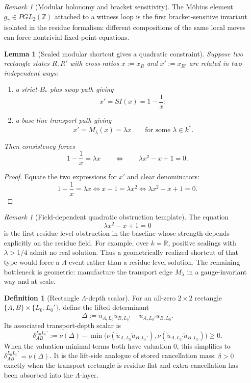 \documentclass[11pt]{amsart}
\numberwithin{equation}{section}
\theoremstyle{plain}
\newtheorem{lemma}[theorem]{Lemma}
\theoremstyle{definition}
\newtheorem{definition}[theorem]{Definition}
\theoremstyle{remark}
\newtheorem{remark}[theorem]{Remark}
\newcommand{\Lam}{\Lambda}
\begin{document}
\begin{remark}[Modular holonomy and bracket sensitivity]
\label{rem:modular-holonomy-associator}
The M\"obius element $g_\gamma\in PGL_2(\mathbb Z)$ attached to a witness loop is the first bracket-sensitive invariant isolated in the residue formalism: different compositions of the same local moves can force nontrivial fixed-point equations.
\end{remark}

\begin{lemma}[Scaled modular shortcut gives a quadratic constraint]
\label{lem:scaled-modular-shortcut-quadratic}
Suppose two rectangle states $R,R'$ with cross-ratios $x:=x_R$ and $x':=x_{R'}$ are related in two independent ways:
\begin{enumerate}[leftmargin=2em]
  \item a strict-$B_*$ plus swap path giving
  \[
  x'=SI(x)=1-\frac{1}{x};
  \]
  \item a base-line transport path giving
  \[
  x'=M_\lambda(x)=\lambda x
  \qquad\text{for some }\lambda\in k^*.
  \]
\end{enumerate}
Then consistency forces
\[
1-\frac1x=\lambda x
\qquad\Longleftrightarrow\qquad
\lambda x^2-x+1=0.
\tag{29.2}
\]
\end{lemma}

\begin{proof}
Equate the two expressions for $x'$ and clear denominators:
\[
1-\frac1x=\lambda x
\iff x-1=\lambda x^2
\iff \lambda x^2-x+1=0.
\]
\end{proof}

\begin{remark}[Field-dependent quadratic obstruction template]
\label{rem:quadratic-shortcut-template}
The equation
\[
\lambda x^2-x+1=0
\]
is the first residue-level obstruction in the baseline whose strength depends explicitly on the residue field. For example, over $k=\mathbb R$, positive scalings with $\lambda>1/4$ admit no real solution. Thus a geometrically realized shortcut of that type would force a $\Lam$-event rather than a residue-level solution. The remaining bottleneck is geometric: manufacture the transport edge $M_\lambda$ in a gauge-invariant way and at scale.
\end{remark}

\begin{definition}[Rectangle $\Lam$-depth scalar]
\label{def:rectangle-lam-depth-scalar}
For an all-zero $2\times2$ rectangle $\{A,B\}\times\{L_0,L_0'\}$, define the lifted determinant
\[
\Delta:=\widetilde u_{A,L_0}\widetilde u_{B,L_0'}-\widetilde u_{A,L_0'}\widetilde u_{B,L_0}.
\]
Its associated transport-depth scalar is
\[
\delta_{AB}^{L_0L_0'}:=\nu(\Delta)-\min\bigl(\nu(\widetilde u_{A,L_0}\widetilde u_{B,L_0'}),\nu(\widetilde u_{A,L_0'}\widetilde u_{B,L_0})\bigr)\ge 0.
\tag{30.5}
\]
When the valuation-minimal terms both have valuation $0$, this simplifies to $\delta_{AB}^{L_0L_0'}=\nu(\Delta)$. It is the lift-side analogue of stored cancellation mass: $\delta>0$ exactly when the transport rectangle is residue-flat and extra cancellation has been absorbed into the $\Lam$-layer.
\end{definition}
\end{document}
